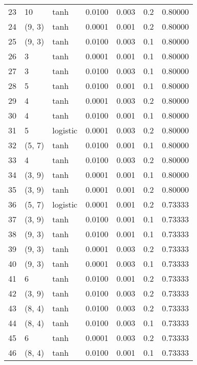 \begin{tabular}{lllrrrr}
23  &          10 &      tanh &  0.0100 &  0.003 &  0.2 &   0.80000 \\
24  &      (9, 3) &      tanh &  0.0001 &  0.001 &  0.2 &   0.80000 \\
25  &      (9, 3) &      tanh &  0.0100 &  0.003 &  0.1 &   0.80000 \\
26  &           3 &      tanh &  0.0001 &  0.001 &  0.1 &   0.80000 \\
27  &           3 &      tanh &  0.0100 &  0.003 &  0.1 &   0.80000 \\
28  &           5 &      tanh &  0.0100 &  0.001 &  0.1 &   0.80000 \\
29  &           4 &      tanh &  0.0001 &  0.003 &  0.2 &   0.80000 \\
30  &           4 &      tanh &  0.0100 &  0.001 &  0.1 &   0.80000 \\
31  &           5 &  logistic &  0.0001 &  0.003 &  0.2 &   0.80000 \\
32  &      (5, 7) &      tanh &  0.0100 &  0.001 &  0.1 &   0.80000 \\
33  &           4 &      tanh &  0.0100 &  0.003 &  0.2 &   0.80000 \\
34  &      (3, 9) &      tanh &  0.0001 &  0.001 &  0.1 &   0.80000 \\
35  &      (3, 9) &      tanh &  0.0001 &  0.001 &  0.2 &   0.80000 \\
36  &      (5, 7) &  logistic &  0.0001 &  0.001 &  0.2 &   0.73333 \\
37  &      (3, 9) &      tanh &  0.0100 &  0.001 &  0.1 &   0.73333 \\
38  &      (9, 3) &      tanh &  0.0100 &  0.001 &  0.1 &   0.73333 \\
39  &      (9, 3) &      tanh &  0.0001 &  0.003 &  0.2 &   0.73333 \\
40  &      (9, 3) &      tanh &  0.0001 &  0.003 &  0.1 &   0.73333 \\
41  &           6 &      tanh &  0.0100 &  0.001 &  0.2 &   0.73333 \\
42  &      (3, 9) &      tanh &  0.0100 &  0.003 &  0.2 &   0.73333 \\
43  &      (8, 4) &      tanh &  0.0100 &  0.003 &  0.2 &   0.73333 \\
44  &      (8, 4) &      tanh &  0.0100 &  0.003 &  0.1 &   0.73333 \\
45  &           6 &      tanh &  0.0001 &  0.003 &  0.2 &   0.73333 \\
46  &      (8, 4) &      tanh &  0.0100 &  0.001 &  0.1 &   0.73333 \\

\end{tabular}
